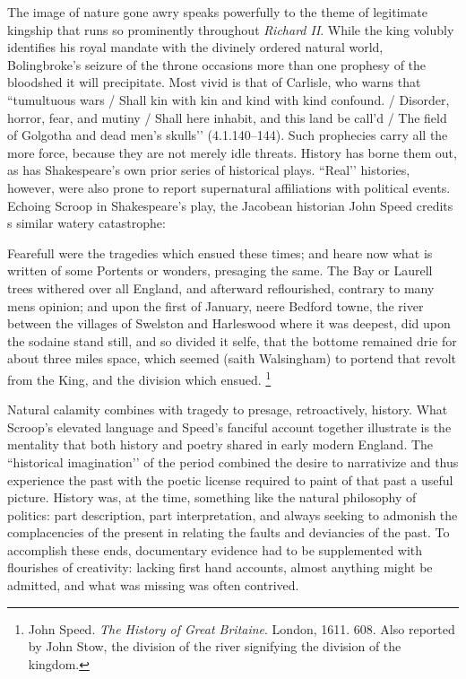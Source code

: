 The image of nature gone awry speaks powerfully to the theme of legitimate kingship that runs so prominently throughout \emph{Richard II}.
While the king volubly identifies his royal mandate with the divinely ordered natural world, Bolingbroke’s seizure of the throne occasions more than one prophesy of the bloodshed it will precipitate.
Most vivid is that of Carlisle, who warns that ``tumultuous wars /  Shall kin with kin and kind with kind confound.
/ Disorder, horror, fear, and mutiny / Shall here inhabit, and this land be call’d / The field of Golgotha and dead men’s skulls’’ (4.1.140--144).
Such prophecies carry all the more force, because they are not merely idle threats.
History has borne them out, as has Shakespeare’s own prior series of historical plays.
``Real’’ histories, however, were also prone to report supernatural affiliations with political events.
Echoing Scroop in Shakespeare’s play, the Jacobean historian John Speed credits s similar watery catastrophe:
\begin{bq}
Fearefull were the tragedies which ensued these times; and heare now what is written of some Portents or wonders, presaging the same.
The Bay or Laurell trees withered over all England, and afterward reflourished, contrary to many mens opinion; and upon the first of January, neere Bedford towne, the river between the villages of Swelston and Harleswood where it was deepest, did upon the sodaine stand still, and so divided it selfe, that the bottome remained drie for about three miles space, which seemed (saith Walsingham) to portend that revolt from the King, and the division which ensued.
\footnote{John Speed. \emph{The History of Great Britaine}. London, 1611. 608.
Also reported by John Stow, the division of the river signifying the division of the kingdom.}
\end{bq} 
Natural calamity combines with tragedy to presage, retroactively, history.
What Scroop’s elevated language and Speed’s fanciful account together illustrate is the mentality that both history and poetry shared in early modern England.
The ``historical imagination’’ of the period combined the desire to narrativize and thus experience the past with the poetic license required to paint of that past a useful picture.
History was, at the time, something like the natural philosophy of politics: part description, part interpretation, and always seeking to admonish the complacencies of the present in relating the faults and deviancies of the past.
To accomplish these ends, documentary evidence had to be supplemented with flourishes of creativity: lacking first hand accounts, almost anything might be admitted, and what was missing was often contrived.
